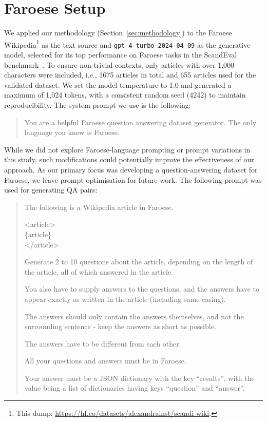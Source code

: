 \documentclass[11pt]{article}
\newcommand{\wikiurl}{\url{https://hf.co/datasets/alexandrainst/scandi-wiki}}
\begin{document}
\section{Faroese Setup}
\label{sec:faroese_setup}

We applied our methodology (Section~\ref{sec:methodology}) to the Faroese
Wikipedia\footnote{This dump: \wikiurl.} as the text source and
\texttt{gpt-4-turbo-2024-04-09} \cite{openai2023newmodels} as the generative model,
selected for its top performance on Faroese tasks in the ScandEval
benchmark~\cite{nielsen2023scandeval,nielsen2024encoder}. To ensure non-trivial
contexts, only articles with over 1,000 characters were included, i.e., 1675 articles in
total and 655 articles used for the validated dataset. We set the model temperature to
1.0 and generated a maximum of 1,024 tokens, with a consistent random seed (4242) to
maintain reproducibility. The system prompt we use is the following:

\begin{quote}
\small
You are a helpful Faroese question answering dataset generator. The only language you know is Faroese.
\end{quote}

While we did not explore Faroese-language prompting or prompt variations in this study,
such modifications could potentially improve the effectiveness of our approach. As our
primary focus was developing a question-answering dataset for Faroese, we leave prompt
optimisation for future work. The following prompt was used for generating QA pairs:

\begin{quote}
\small
The following is a Wikipedia article in Faroese.

<article>\\
\{article\}\\
</article>

Generate 2 to 10 questions about the article, depending on the length of the article, all of which answered in the article.

You also have to supply answers to the questions, and the answers have to appear exactly as written in the article (including same casing).

The answers should only contain the answers themselves, and not the surrounding sentence - keep the answers as short as possible.

The answers have to be different from each other.

All your questions and answers must be in Faroese.

Your answer must be a JSON dictionary with the key ``results'', with the value being a list of dictionaries having keys ``question'' and ``answer''.
\end{quote}
\end{document}
